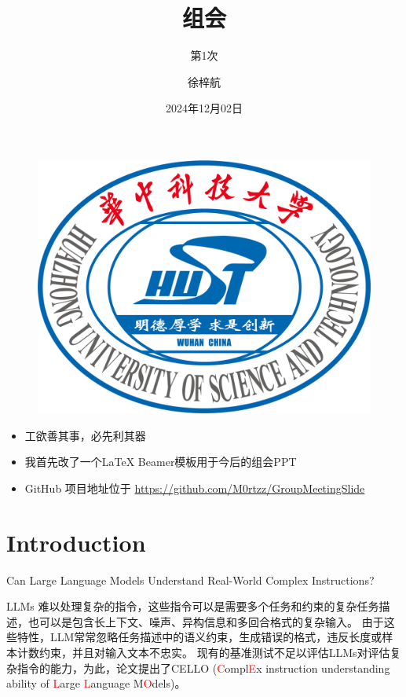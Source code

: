\documentclass{beamer}
\author{徐梓航}
\title{组会}
\subtitle{第1次}
\institute{华中科技大学计算机科学与技术学院}
\date{2024年12月02日}
\begin{document}
\kaishu
\begin{frame}
    \titlepage
    \begin{figure}[htpb]
        \begin{center}
            \includegraphics[width=0.2\linewidth]{images/templates/HUST_LOGO.png}
        \end{center}
    \end{figure}
\end{frame}

\begin{frame}
    \begin{itemize}[<+->]
        \item {工欲善其事，必先利其器}
        \item {我首先改了一个\LaTeX{} Beamer模板用于今后的组会PPT}
        \item GitHub 项目地址位于 \url{https://github.com/M0rtzz/GroupMeetingSlide}
    \end{itemize}
\end{frame}

\begin{frame}
    \tableofcontents[sectionstyle=show,subsectionstyle=show/shaded/hide,subsubsectionstyle=show/shaded/hide]
\end{frame}

\section{Introduction}

\begin{frame}{Can Large Language Models Understand Real-World Complex Instructions?}

    LLMs 难以处理复杂的指令，这些指令可以是需要多个任务和约束的复杂任务描述，也可以是包含长上下文、噪声、异构信息和多回合格式的复杂输入。
    \newline
    \newline
    由于这些特性，LLM常常忽略任务描述中的语义约束，生成错误的格式，违反长度或样本计数约束，并且对输入文本不忠实。
    \newline
    \newline
    现有的基准测试不足以评估LLMs对评估复杂指令的能力，为此，论文提出了CELLO (\textcolor{red}{C}ompl\textcolor{red}{E}x instruction understanding ability of \textcolor{red}{L}arge \textcolor{red}{L}anguage M\textcolor{red}{O}dels)。

\end{frame}
\end{document}
